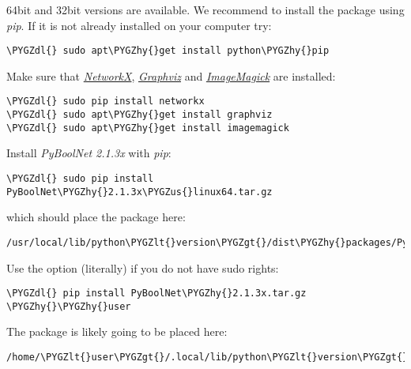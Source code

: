 \documentclass[letterpaper,10pt,english]{sphinxmanual}
\def\PYGZus{\char`\_}
\def\PYGZlt{\char`\<}
\def\PYGZgt{\char`\>}
\def\PYGZdl{\char`\$}
\def\PYGZhy{\char`\-}
\begin{document}
64bit and 32bit versions are available. We recommend to install the package using \emph{pip}. If it is not already installed on your computer try:

\begin{Verbatim}[commandchars=\\\{\}]
\PYGZdl{} sudo apt\PYGZhy{}get install python\PYGZhy{}pip
\end{Verbatim}

Make sure that {\hyperref[Installation:installation-networkx]{\emph{NetworkX}}}, {\hyperref[Installation:installation-graphviz]{\emph{Graphviz}}} and {\hyperref[Installation:installation-imagemagick]{\emph{ImageMagick}}} are installed:

\begin{Verbatim}[commandchars=\\\{\}]
\PYGZdl{} sudo pip install networkx
\PYGZdl{} sudo apt\PYGZhy{}get install graphviz
\PYGZdl{} sudo apt\PYGZhy{}get install imagemagick
\end{Verbatim}

Install \emph{PyBoolNet 2.1.3x} with \emph{pip}:

\begin{Verbatim}[commandchars=\\\{\}]
\PYGZdl{} sudo pip install PyBoolNet\PYGZhy{}2.1.3x\PYGZus{}linux64.tar.gz
\end{Verbatim}

which should place the package here:

\begin{Verbatim}[commandchars=\\\{\}]
/usr/local/lib/python\PYGZlt{}version\PYGZgt{}/dist\PYGZhy{}packages/PyBoolNet
\end{Verbatim}

Use the option  (literally) if you do not have sudo rights:

\begin{Verbatim}[commandchars=\\\{\}]
\PYGZdl{} pip install PyBoolNet\PYGZhy{}2.1.3x.tar.gz \PYGZhy{}\PYGZhy{}user
\end{Verbatim}

The package is likely going to be placed here:

\begin{Verbatim}[commandchars=\\\{\}]
/home/\PYGZlt{}user\PYGZgt{}/.local/lib/python\PYGZlt{}version\PYGZgt{}/dist\PYGZhy{}packages/PyBoolNet
\end{Verbatim}
\end{document}
